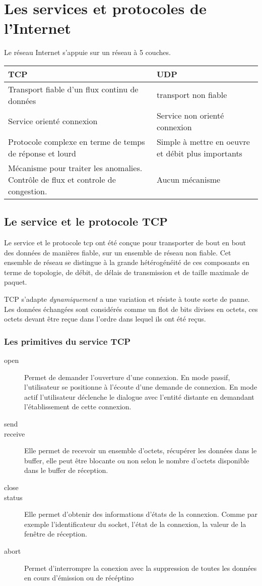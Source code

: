 \documentclass[12pt,a4paper,openany]{book}
\begin{document}
	\chapter{Les services et protocoles de l'Internet}
	Le réseau Internet s'appuie sur un réseau à 5 couches. 

	\begin{tabular}{p{8cm}|p{8cm}}
		\textbf{TCP} & \textbf{UDP}\\
		\hline
		Transport fiable d'un flux continu de données & transport non fiable\\
		\hline
		Service orienté connexion & Service non orienté connexion \\
		\hline
		Protocole complexe en terme de temps de réponse et lourd & Simple à mettre en oeuvre et débit plus importants\\
		\hline
		Mécanisme pour traiter les anomalies. Contrôle de flux et controle de congestion.& Aucun mécanisme\\
	\end{tabular}
	
	\section{Le service et le protocole TCP}
	Le service et le protocole tcp ont été conçue pour transporter de bout en bout des données de manières fiable, sur un ensemble de réseau non
	fiable. Cet ensemble de réseau se distingue à la grande hétérogénéité de ces composants en terme de topologie, de débit, de délais de transmission
	et de taille maximale de paquet.

	TCP s'adapte \textit{dynamiquement} a une variation et résiste à toute sorte de panne. Les données échangées sont considérés comme un flot de bits divises en
	octets, ces octets devant être reçue dans l'ordre dans lequel ils ont été reçus.

	\subsection{Les primitives du service TCP}
	\begin{description}
		\item[open] Permet de demander l'ouverture d'une connexion. En mode passif, l'utilisateur se positionne à l'écoute d'une demande de connexion.
			En mode actif l'utilisateur déclenche le dialogue avec l'entité distante en demandant l'établissement de cette connexion.
		\item[send] 
		\item[receive] Elle permet de recevoir un ensemble d'octets, récupérer les données dans le buffer, elle peut être blocante ou non selon le
			nombre d'octets disponible dans le buffer de réception.
		\item[close]  
		\item[status] Elle permet d'obtenir des informations d'états de la connexion. Comme par exemple l'identificateur du socket, l'état de la
			connexion, la valeur de la fenêtre de réception.
		\item[abort]  Permet d'interrompre la conexion avec la suppression de toutes les données en cours d'émission ou de récéptino
	\end{description}
\end{document}
